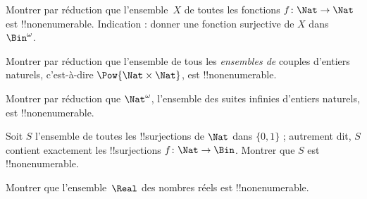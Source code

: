 \documentclass[../../../include/open-logic-section]{subfiles}
\begin{document}
\begin{prob}\label{sfr:siz:red-alt:prob:nat-nat}
  Montrer par réduction que l'ensemble~$X$ de toutes les fonctions
  $f\colon \Nat \to \Nat$ est !!{nonenumerable}. Indication :
  donner une fonction surjective de $X$ dans~$\Bin^\omega$.
\end{prob}

\begin{prob}
Montrer par réduction que l'ensemble de tous les \emph{ensembles de}
couples d'entiers naturels, c'est-à-dire $\Pow{\Nat \times \Nat}$,
est !!{nonenumerable}.
\end{prob}

\begin{prob}
Montrer par réduction que $\Nat^\omega$, l'ensemble des suites
infinies d'entiers naturels, est !!{nonenumerable}.
\end{prob}

%

\begin{prob}
Soit $S$ l'ensemble de toutes les !!{surjection}s de $\Nat$ dans
$\{0,1\}$ ; autrement dit, $S$ contient exactement les
!!{surjection}s $f \colon \Nat \to \Bin$. Montrer que $S$
est !!{nonenumerable}.
\end{prob}

\begin{prob}
Montrer que l'ensemble~$\Real$ des nombres réels est !!{nonenumerable}.
\end{prob}
\end{document}
